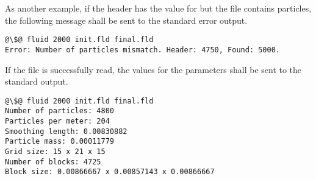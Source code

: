 As another example, if the header has the value  for  but
the file contains  particles, the following message shall be sent to
the standard error output.

\begin{lstlisting}[style=terminal,escapechar=@]
@\$@ fluid 2000 init.fld final.fld
Error: Number of particles mismatch. Header: 4750, Found: 5000.
\end{lstlisting}

If the file is successfully read, the values for the parameters shall be sent
to the standard output.

\begin{lstlisting}[style=terminal,escapechar=@]
@\$@ fluid 2000 init.fld final.fld
Number of particles: 4800
Particles per meter: 204
Smoothing length: 0.00830882
Particle mass: 0.00011779
Grid size: 15 x 21 x 15
Number of blocks: 4725
Block size: 0.00866667 x 0.00857143 x 0.00866667
\end{lstlisting}

